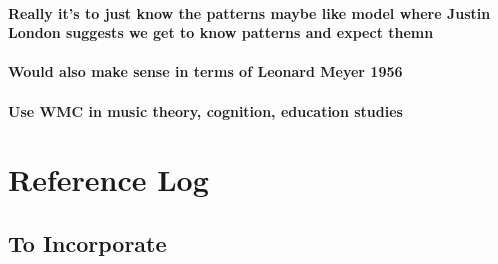 \documentclass[]{book}
\theoremstyle{definition}
\theoremstyle{definition}
\theoremstyle{definition}
\theoremstyle{remark}
\begin{document}
\hypertarget{really-its-to-just-know-the-patterns-maybe-like-model-where-justin-london-suggests-we-get-to-know-patterns-and-expect-themn}{%
\subsubsection{Really it's to just know the patterns maybe like model
where Justin London suggests we get to know patterns and expect
themn}\label{really-its-to-just-know-the-patterns-maybe-like-model-where-justin-london-suggests-we-get-to-know-patterns-and-expect-themn}}

\hypertarget{would-also-make-sense-in-terms-of-leonard-meyer-1956}{%
\subsubsection{Would also make sense in terms of Leonard Meyer
1956}\label{would-also-make-sense-in-terms-of-leonard-meyer-1956}}

\hypertarget{use-wmc-in-music-theory-cognition-education-studies}{%
\subsubsection{Use WMC in music theory, cognition, education
studies}\label{use-wmc-in-music-theory-cognition-education-studies}}

\hypertarget{reference-log}{%
\chapter{Reference Log}\label{reference-log}}

\hypertarget{to-incorporate}{%
\section{To Incorporate}\label{to-incorporate}}
\end{document}
